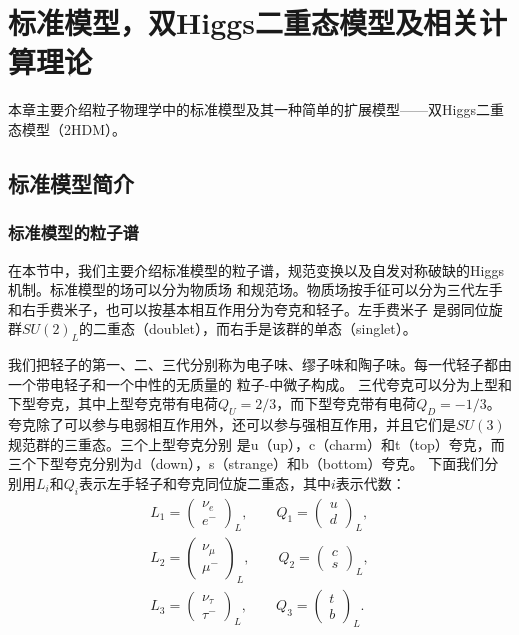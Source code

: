 ﻿
\chapter{标准模型，双Higgs二重态模型及相关计算理论}
\label{chap:theory}
本章主要介绍粒子物理学中的标准模型及其一种简单的扩展模型——双Higgs二重态模型（2HDM）。

\section{标准模型简介}
\subsection{标准模型的粒子谱}
在本节中，我们主要介绍标准模型的粒子谱，规范变换以及自发对称破缺的Higgs机制。标准模型的场可以分为物质场
和规范场。物质场按手征可以分为三代左手和右手费米子，也可以按基本相互作用分为夸克和轻子。左手费米子
是弱同位旋群$SU(2)_L$的二重态（doublet），而右手是该群的单态（singlet）。

我们把轻子的第一、二、三代分别称为电子味、缪子味和陶子味。每一代轻子都由一个带电轻子和一个中性的无质量的
粒子-中微子构成。
三代夸克可以分为上型和下型夸克，其中上型夸克带有电荷$Q_U = 2/3$，而下型夸克带有电荷$Q_D = -1/3$。
夸克除了可以参与电弱相互作用外，还可以参与强相互作用，并且它们是$SU(3)$规范群的三重态。三个上型夸克分别
是u（up），c（charm）和t（top）夸克，而三个下型夸克分别为d（down），s（strange）和b（bottom）夸克。
下面我们分别用$L_i$和$Q_i$表示左手轻子和夸克同位旋二重态，其中$i$表示代数：
\begin{eqnarray}
L_1 = \left( \begin{array}{cc} \nu_e \\ e^- \end{array}\right)_L , \qquad
Q_1 = \left( \begin{array}{cc} u \\ d \end{array} \right)_L ,
\nonumber \\
L_2 = \left( \begin{array}{cc} \nu_{\mu} \\ \mu^- \end{array}\right)_L , \qquad
Q_2 = \left( \begin{array}{cc} c \\ s \end{array} \right)_L ,
\nonumber \\
L_3 = \left( \begin{array}{cc} \nu_{\tau} \\ \tau^- \end{array}\right)_L , \qquad
Q_3 = \left( \begin{array}{cc} t \\ b \end{array} \right)_L .
\end{eqnarray}

